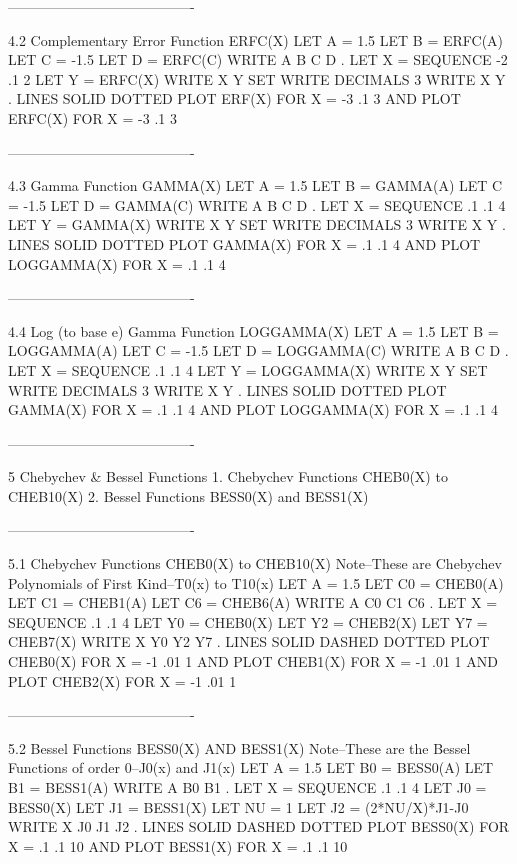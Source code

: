 ----------------------------------------
 
4.2
Complementary Error Function ERFC(X)
      LET A = 1.5
      LET B = ERFC(A)
      LET C = -1.5
      LET D = ERFC(C)
      WRITE A B C D
      .
      LET X = SEQUENCE -2 .1 2
      LET Y = ERFC(X)
      WRITE X Y
      SET WRITE DECIMALS 3
      WRITE X Y
      .
      LINES SOLID DOTTED
      PLOT ERF(X) FOR X = -3 .1 3 AND
      PLOT ERFC(X) FOR X = -3 .1 3
 
----------------------------------------
 
4.3
Gamma Function GAMMA(X)
      LET A = 1.5
      LET B = GAMMA(A)
      LET C = -1.5
      LET D = GAMMA(C)
      WRITE A B C D
      .
      LET X = SEQUENCE .1 .1 4
      LET Y = GAMMA(X)
      WRITE X Y
      SET WRITE DECIMALS 3
      WRITE X Y
      .
      LINES SOLID DOTTED
      PLOT GAMMA(X) FOR X = .1 .1 4 AND
      PLOT LOGGAMMA(X) FOR X = .1 .1 4
 
----------------------------------------
 
4.4
Log (to base e) Gamma Function LOGGAMMA(X)
      LET A = 1.5
      LET B = LOGGAMMA(A)
      LET C = -1.5
      LET D = LOGGAMMA(C)
      WRITE A B C D
      .
      LET X = SEQUENCE .1 .1 4
      LET Y = LOGGAMMA(X)
      WRITE X Y
      SET WRITE DECIMALS 3
      WRITE X Y
      .
      LINES SOLID DOTTED
      PLOT GAMMA(X) FOR X = .1 .1 4 AND
      PLOT LOGGAMMA(X) FOR X = .1 .1 4
 
----------------------------------------
 
5
Chebychev & Bessel Functions
   1. Chebychev Functions CHEB0(X) to CHEB10(X)
   2. Bessel Functions BESS0(X) and BESS1(X)
 
----------------------------------------
 
5.1
Chebychev Functions CHEB0(X) to CHEB10(X)
Note--These are Chebychev Polynomials of First Kind--T0(x) to T10(x)
      LET A = 1.5
      LET C0 = CHEB0(A)
      LET C1 = CHEB1(A)
      LET C6 = CHEB6(A)
      WRITE A C0 C1 C6
      .
      LET X = SEQUENCE .1 .1 4
      LET Y0 = CHEB0(X)
      LET Y2 = CHEB2(X)
      LET Y7 = CHEB7(X)
      WRITE X Y0 Y2 Y7
      .
      LINES SOLID DASHED DOTTED
      PLOT CHEB0(X) FOR X = -1 .01 1 AND
      PLOT CHEB1(X) FOR X = -1 .01 1 AND
      PLOT CHEB2(X) FOR X = -1 .01 1
 
----------------------------------------
 
5.2
Bessel Functions BESS0(X) AND BESS1(X)
Note--These are the Bessel Functions of order 0--J0(x) and J1(x)
      LET A = 1.5
      LET B0 = BESS0(A)
      LET B1 = BESS1(A)
      WRITE A B0 B1
      .
      LET X = SEQUENCE .1 .1 4
      LET J0 = BESS0(X)
      LET J1 = BESS1(X)
      LET NU = 1
      LET J2 = (2*NU/X)*J1-J0
      WRITE X J0 J1 J2
      .
      LINES SOLID DASHED DOTTED
      PLOT BESS0(X) FOR X = .1 .1 10 AND
      PLOT BESS1(X) FOR X = .1 .1 10
 
